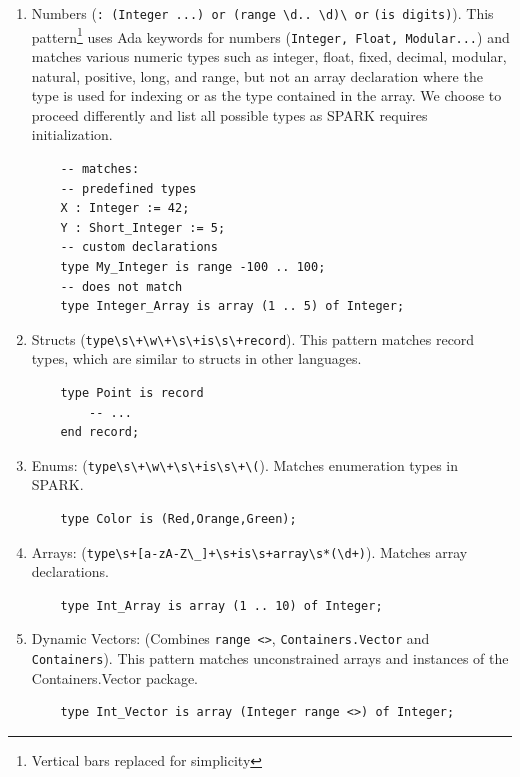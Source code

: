 \documentclass[nomenclature, english, bibtex]{kththesis}
\begin{document}
\begin{enumerate}
    \item Numbers 
(\verb|: (Integer ...) or (range \d.. \d)\ or| \verb|(is digits)|).
This pattern\footnote{Vertical bars replaced for simplicity} uses Ada keywords for numbers (\texttt{Integer, Float, Modular...}) and matches various numeric types such as integer, float, fixed, decimal, modular, natural, positive, long, and range, but not an array declaration where the type is used for indexing or as the type contained in the array. We choose to proceed differently and list all possible types as SPARK requires initialization.

    \begin{verbatim}
    -- matches:
    -- predefined types
    X : Integer := 42;
    Y : Short_Integer := 5;
    -- custom declarations
    type My_Integer is range -100 .. 100;
    -- does not match
    type Integer_Array is array (1 .. 5) of Integer;
    \end{verbatim}

    \item Structs (\verb|type\s\+\w\+\s\+is\s\+record|). This pattern matches record types, which are similar to structs in other languages.

    \begin{verbatim}
    type Point is record
        -- ...
    end record;
    \end{verbatim}

    \item Enums: (\verb|type\s\+\w\+\s\+is\s\+\(|). Matches enumeration types in SPARK.

    \begin{verbatim}
    type Color is (Red,Orange,Green);
    \end{verbatim}

    \item Arrays: (\verb|type\s+[a-zA-Z\_]+\s+is\s+array\s*(\d+)|). Matches array declarations.

    \begin{verbatim}
    type Int_Array is array (1 .. 10) of Integer;
    \end{verbatim}

    \item Dynamic Vectors: (Combines \verb|range <>|, \verb|Containers.Vector| and \verb|Containers|).
This pattern matches unconstrained arrays and instances of the Containers.Vector package.

    \begin{verbatim}
    type Int_Vector is array (Integer range <>) of Integer;
    \end{verbatim}


\end{enumerate}
\end{document}
